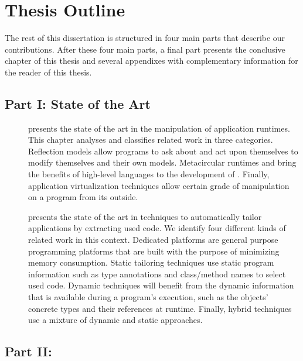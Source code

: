 \section{Thesis Outline}

The rest of this dissertation is structured in four main parts that describe our contributions. After these four main parts, a final part presents the conclusive chapter of this thesis and several appendixes with complementary information for the reader of this thesis.

\subsection{Part I: State of the Art}

\begin{description}
\item[] presents the state of the art in the manipulation of application runtimes. This chapter analyses and classifies related work in three categories. Reflection models allow programs to ask about and act upon themselves to modify themselves and their own models. Metacircular runtimes and \VMs bring the benefits of high-level languages to the development of \VMs. Finally, application virtualization techniques allow certain grade of manipulation on a program from its outside.

\item[] presents the state of the art in techniques to automatically tailor applications by extracting used code. We identify four different kinds of related work in this context. Dedicated platforms are general purpose programming platforms that are built with the purpose of minimizing memory consumption. Static tailoring techniques use static program information such as type annotations and class/method names to select used code. Dynamic techniques will benefit from the dynamic information that is available during a program's execution, such as the objects' concrete types and their references at runtime. Finally, hybrid techniques use a mixture of dynamic and static approaches.

\end{description}

\subsection{Part II: \VTT}

